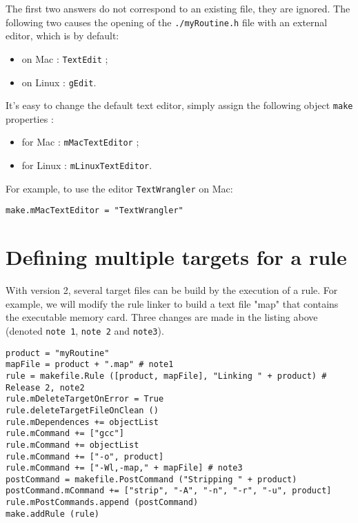\documentclass[a4paper,11pt]{extarticle}
\begin{document}
The first two answers do not correspond to an existing file, they are ignored. The following two causes the opening of the \texttt{./myRoutine.h}  file with an external editor, which is by default:
\begin{itemize}
\item on Mac : \texttt{TextEdit} ;
\item on Linux : \texttt{gEdit}.
\end{itemize}

It's easy to change the default text editor, simply assign the following object  \texttt{make} properties :
\begin{itemize}
\item for Mac : \texttt{mMacTextEditor} ;
\item for Linux : \texttt{mLinuxTextEditor}.
\end{itemize}

For example, to use the editor \texttt{TextWrangler} on Mac:
\begin{lstlisting}[language=Py]
make.mMacTextEditor = "TextWrangler"
\end{lstlisting}





\section{Defining multiple targets for a rule}\label{plusieursCibles}

With version 2, several target files can be build by the execution of a rule. For example, we will modify the rule linker to build a text file "map" that contains the executable memory card. Three changes are made in the listing above (denoted \texttt{note 1}, \texttt{note 2} and \texttt{note3}).

\begin{lstlisting}[language=Py]
product = "myRoutine"
mapFile = product + ".map" # note1
rule = makefile.Rule ([product, mapFile], "Linking " + product) # Release 2, note2
rule.mDeleteTargetOnError = True
rule.deleteTargetFileOnClean ()
rule.mDependences += objectList
rule.mCommand += ["gcc"]
rule.mCommand += objectList
rule.mCommand += ["-o", product]
rule.mCommand += ["-Wl,-map," + mapFile] # note3
postCommand = makefile.PostCommand ("Stripping " + product)
postCommand.mCommand += ["strip", "-A", "-n", "-r", "-u", product]
rule.mPostCommands.append (postCommand)
make.addRule (rule)
\end{lstlisting}
\end{document}
